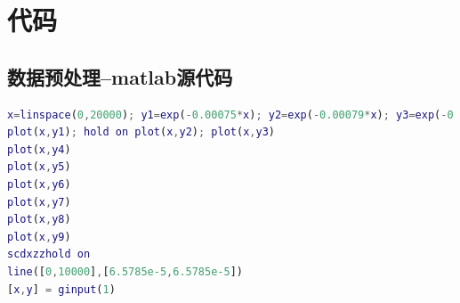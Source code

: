 \documentclass{whutmod}
\begin{document}
	
	\newpage
	\appendix %
\section{代码}
\subsection{数据预处理--matlab源代码}
\begin{lstlisting}[language=matlab]
x=linspace(0,20000); y1=exp(-0.00075*x); y2=exp(-0.00079*x); y3=exp(-0.00086*x); y4=exp(-0.00090*x); y5=exp(-0.00118*x); y6=exp(-0.00105*x); y7=exp(-0.00111*x); y8=exp(-0.00117*x); y9=exp(-0.00118*x);
plot(x,y1); hold on plot(x,y2); plot(x,y3) 
plot(x,y4)
plot(x,y5)
plot(x,y6)
plot(x,y7)
plot(x,y8)
plot(x,y9)
scdxzzhold on
line([0,10000],[6.5785e-5,6.5785e-5])
[x,y] = ginput(1)

\end{lstlisting}
\end{document}
